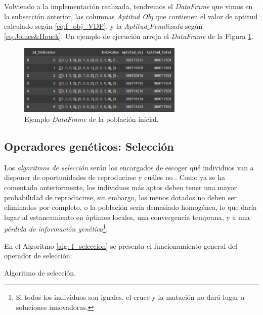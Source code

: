 \documentclass[12pt,a4paper]{book}
\begin{document}
Volviendo a la implementación realizada, tendremos el \textsl{DataFrame} que vimos en la subsección anterior, las columnas \textsl{Aptitud$\_$Obj} que contienen el valor de aptitud calculado según \ref{eq:f_obj_VDP}, y la \textsl{Aptitud$\_$Penalizada} según \ref{eq:Joines&Houck}. Un ejemplo de ejecución arroja el  \textsl{DataFrame} de la Figura \ref{fig:pob_inic}.

\begin{figure}[H] 
    	\begin{center}
    	\includegraphics[width=0.7\textwidth]{img/pob_inic.png}
    	\end{center}
    	\caption{Ejemplo \textsl{DataFrame} de la población inicial.}
    	\label{fig:pob_inic}
	\end{figure}

\subsection{Operadores genéticos: Selección}\label{subsec:4_1_4}
Los \textsl{algoritmos de selección} serán los encargados de escoger qué individuos van a disponer de oportunidades de reproducirse y cuáles no \cite{gestal_pose_introduccion_2023}. Como ya se ha comentado anteriormente, los individuos más aptos deben tener una mayor probabilidad de reproducirse, sin embargo, los menos dotados no deben ser eliminados por completo, o la población sería demasiado homogénea, lo que daría lugar al estancamiento en óptimos locales, una convergencia temprana, y a una \textsl{pérdida de información genética}\footnote{Si todos los individuos son iguales, el cruce y la mutación no dará lugar a soluciones innovadoras.}.

En el Algoritmo \ref{alg: f_seleccion} se presenta el funcionamiento general del operador de selección: 

\begin{algorithm}[H]
\DontPrintSemicolon
\SetAlgoLined


\caption{Algoritmo de selección.}
\label{alg: f_seleccion}
\end{algorithm}
\end{document}
